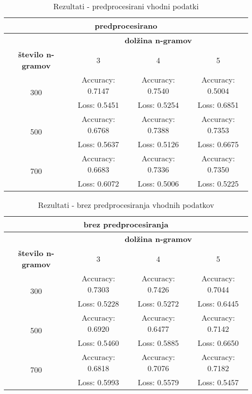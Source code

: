 \documentclass[sigconf,nonacm]{acmart}
\begin{document}
\begin{table}[h!]
	\centering
	\small
	\begin{tabular}{|c|c|c|c|}
		\multicolumn{4}{c}{predprocesirano}\\
		\hline
		& \multicolumn{3}{c}{\textbf{dolžina n-gramov}}\\
		\hline
		\textbf{število n-gramov} & 3 & 4 & 5\\
		\hline
		\multirow{2}{4em}{300} & Accuracy: 0.7147 & Accuracy: 0.7540 & Accuracy: 0.5004\\
		& Loss: 0.5451 & Loss: 0.5254 & Loss: 0.6851\\
		\hline
		\multirow{2}{4em}{500} & Accuracy: 0.6768 & Accuracy: 0.7388 & Accuracy: 0.7353\\
		& Loss: 0.5637 & Loss: 0.5126 & Loss: 0.6675\\
		\hline
		\multirow{2}{4em}{700} & Accuracy: 0.6683 & Accuracy: 0.7336 & Accuracy: 0.7350\\
		& Loss: 0.6072 & Loss: 0.5006 & Loss: 0.5225\\
		\hline
	\end{tabular}
	\caption{Rezultati - predprocesirani vhodni podatki}
	\label{tab:sample}
\end{table}
\begin{table}[h!]
	\centering
	\small
	\begin{tabular}{|c|c|c|c|}
		\multicolumn{4}{c}{brez predprocesiranja}\\
		\hline
		& \multicolumn{3}{c}{\textbf{dolžina n-gramov}}\\
		\hline
		\textbf{število n-gramov} & 3 & 4 & 5\\
		\hline
		\multirow{2}{4em}{300} & Accuracy: 0.7303 & Accuracy: 0.7426 & Accuracy: 0.7044\\
		& Loss: 0.5228 & Loss: 0.5272 & Loss: 0.6445\\
		\hline
		\multirow{2}{4em}{500} & Accuracy: 0.6920 & Accuracy: 0.6477 & Accuracy: 0.7142\\
		& Loss: 0.5460 & Loss: 0.5885 & Loss: 0.6650\\
		\hline
		\multirow{2}{4em}{700} & Accuracy: 0.6818 & Accuracy: 0.7076 & Accuracy: 0.7182\\
		& Loss: 0.5993 & Loss: 0.5579 & Loss: 0.5457\\
		\hline
	\end{tabular}
	\caption{Rezultati - brez predprocesiranja vhodnih podatkov}
	\label{tab:sample}
\end{table}
\end{document}
